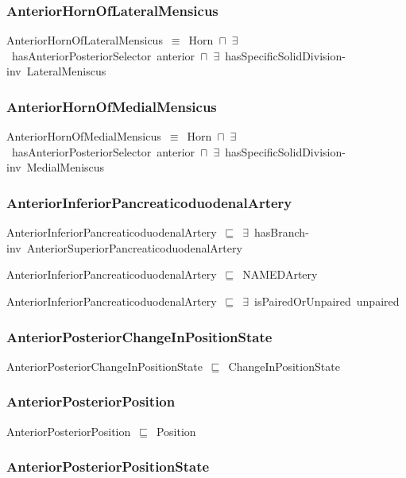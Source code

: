 \documentclass{article}
\begin{document}
\subsubsection*{AnteriorHornOfLateralMensicus}

AnteriorHornOfLateralMensicus~\ensuremath{\equiv}~Horn~\ensuremath{\sqcap}~\ensuremath{\exists}~hasAnteriorPosteriorSelector~anterior~\ensuremath{\sqcap}~\ensuremath{\exists}~hasSpecificSolidDivision-inv~LateralMeniscus

\subsubsection*{AnteriorHornOfMedialMensicus}

AnteriorHornOfMedialMensicus~\ensuremath{\equiv}~Horn~\ensuremath{\sqcap}~\ensuremath{\exists}~hasAnteriorPosteriorSelector~anterior~\ensuremath{\sqcap}~\ensuremath{\exists}~hasSpecificSolidDivision-inv~MedialMeniscus

\subsubsection*{AnteriorInferiorPancreaticoduodenalArtery}

AnteriorInferiorPancreaticoduodenalArtery~\ensuremath{\sqsubseteq}~\ensuremath{\exists}~hasBranch-inv~AnteriorSuperiorPancreaticoduodenalArtery~

AnteriorInferiorPancreaticoduodenalArtery~\ensuremath{\sqsubseteq}~NAMEDArtery~

AnteriorInferiorPancreaticoduodenalArtery~\ensuremath{\sqsubseteq}~\ensuremath{\exists}~isPairedOrUnpaired~unpaired~

\subsubsection*{AnteriorPosteriorChangeInPositionState}

AnteriorPosteriorChangeInPositionState~\ensuremath{\sqsubseteq}~ChangeInPositionState~

\subsubsection*{AnteriorPosteriorPosition}

AnteriorPosteriorPosition~\ensuremath{\sqsubseteq}~Position~

\subsubsection*{AnteriorPosteriorPositionState}
\end{document}
